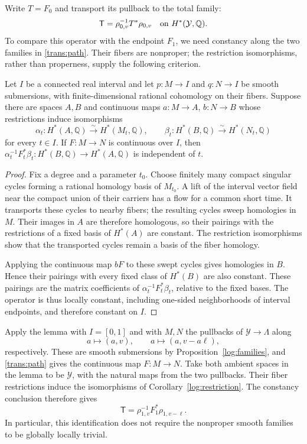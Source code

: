 Write $T=F_0$ and transport its pullback to the total family:
\begin{equation}\label{trans:global-T}
\mathsf T=\rho_{0,v}^{-1}T^*\rho_{0,v}
\quad\text{on }H^*(\mathcal Y,\mathbb Q).
\end{equation}
To compare this operator with the endpoint $F_1$, we need constancy along
the two families in \eqref{trans:path}. Their fibers are nonproper; the
restriction isomorphisms, rather than properness, supply the following
criterion.

\begin{lemma}
\label{log:compact-cycles}
Let $I$ be a connected real interval and let $p:M\to I$ and
$q:N\to I$ be smooth submersions, with finite-dimensional rational
cohomology on their fibers.  Suppose there are spaces $A,B$ and
continuous maps $a:M\to A$, $b:N\to B$ whose restrictions induce
isomorphisms
\[
 \alpha_t:H^*(A,\mathbb Q)\xrightarrow{\sim}H^*(M_t,\mathbb Q),
 \qquad
 \beta_t:H^*(B,\mathbb Q)\xrightarrow{\sim}H^*(N_t,\mathbb Q)
\]
for every $t\in I$.  If $F:M\to N$ is continuous over $I$, then
$\alpha_t^{-1}F_t^*\beta_t:H^*(B,\mathbb Q)\to H^*(A,\mathbb Q)$
is independent of $t$.
\end{lemma}

\begin{proof}
Fix a degree and a parameter $t_0$.  Choose finitely many compact
singular cycles forming a rational homology basis of $M_{t_0}$.
A lift of the interval vector field near the compact union of their
carriers has a flow for a common short time.  It transports these
cycles to nearby fibers; the resulting cycles sweep homologies in
$M$.  Their images in $A$ are therefore homologous, so their
pairings with the restrictions of a fixed basis of $H^*(A)$ are
constant.  The restriction isomorphisms show that the transported
cycles remain a basis of the fiber homology.

Applying the continuous map $bF$ to these swept cycles gives
homologies in $B$.  Hence their pairings with every fixed class
of $H^*(B)$ are also constant.  These pairings are the matrix
coefficients of $\alpha_t^{-1}F_t^*\beta_t$, relative to the
fixed bases.  The operator is thus locally constant, including
one-sided neighborhoods of interval endpoints, and therefore
constant on $I$.
\end{proof}

Apply the lemma with $I=[0,1]$ and with $M,N$ the pullbacks of
$\mathcal Y\to\Lambda$ along
\[
 a\longmapsto(a,v),\qquad a\longmapsto(a,v-a\ell),
\]
respectively. These are smooth submersions by
Proposition~\ref{log:families}, and \eqref{trans:path} gives the continuous
map $F:M\to N$. Take both ambient spaces in the lemma to be
$\mathcal Y$, with the natural maps from the two pullbacks. Their fiber
restrictions induce the isomorphisms of
Corollary~\ref{log:restriction}. The constancy conclusion therefore gives
\begin{equation}\label{trans:endpoint}
\mathsf T=\rho_{1,v}^{-1}F_1^*\rho_{1,v-\ell}.
\end{equation}
In particular, this identification does not require the nonproper smooth families to be globally locally trivial.

